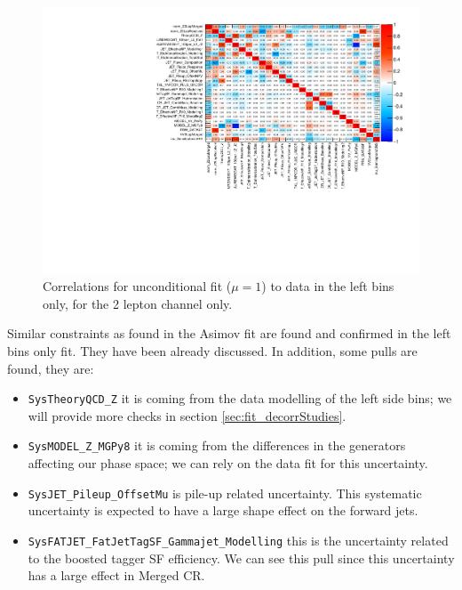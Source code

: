 \begin{figure}[ht]
      \centering
        \includegraphics[width=\linewidth]{figures/2lep/FitResults/corr_HighCorrNoMCStat_DataLeftbins.pdf}
        \caption{Correlations for unconditional fit ($\mu=1$) to data in the left bins only, for the 2 lepton channel only.}
       \label{fig:fit_2lep_corr_left}
\end{figure}

Similar constraints as found in the Asimov fit are found and confirmed in the left bins only fit.
They have been already discussed.
In addition, some pulls are found, they are:

\begin{itemize}

       \item \texttt{SysTheoryQCD\_Z} it is coming from the data modelling of the left side bins;
       we will provide more checks in section \ref{sec:fit_decorrStudies}.

       \item \texttt{SysMODEL\_Z\_MGPy8} it is coming from the differences in the generators affecting our phase space;
       we can rely on the data fit for this uncertainty.

       \item \texttt{SysJET\_Pileup\_OffsetMu} is pile-up related uncertainty.
       This systematic uncertainty is expected to have a large shape effect on the forward jets.

       \item \texttt{SysFATJET\_FatJetTagSF\_Gammajet\_Modelling} this is the uncertainty related to the boosted tagger SF efficiency.
       We can see this pull since this uncertainty has a large effect in Merged CR.
\end{itemize}

